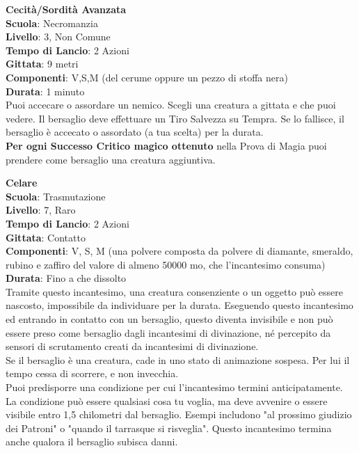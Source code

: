 \begin{multicols}{2}
\medskip\textbf{Cecità/Sordità Avanzata}\\
\textbf{Scuola}: Necromanzia\\
\textbf{Livello}: 3, Non Comune\\
\textbf{Tempo di Lancio}: 2 Azioni\\
\textbf{Gittata}: 9 metri\\
\textbf{Componenti}: V,S,M (del cerume oppure un pezzo di stoffa nera)\\
\textbf{Durata}: 1 minuto\\
Puoi accecare o assordare un nemico. Scegli una creatura a gittata e che puoi vedere. Il bersaglio deve effettuare un Tiro Salvezza su Tempra. Se lo fallisce, il bersaglio è accecato o assordato (a tua scelta) per la durata.\\
\textbf{Per ogni Successo Critico magico ottenuto} nella Prova di Magia puoi prendere come bersaglio una creatura aggiuntiva.

\medskip\textbf{Celare}\\
\textbf{Scuola}: Trasmutazione\\
\textbf{Livello}: 7, Raro\\
\textbf{Tempo di Lancio}: 2 Azioni\\
\textbf{Gittata}: Contatto\\
\textbf{Componenti}: V, S, M (una polvere composta da polvere di diamante, smeraldo, rubino e zaffiro del valore di almeno 50000 mo, che l'incantesimo consuma)\\
\textbf{Durata}: Fino a che dissolto \\
Tramite questo incantesimo, una creatura consenziente o un oggetto può essere nascosto, impossibile da individuare per la durata. Eseguendo questo incantesimo ed entrando in contatto con un bersaglio, questo diventa invisibile e non può essere preso come bersaglio dagli incantesimi di divinazione, né percepito da sensori di scrutamento creati da incantesimi di divinazione.\\
Se il bersaglio è una creatura, cade in uno stato di animazione sospesa. Per lui il tempo cessa di scorrere, e non invecchia. \\
Puoi predisporre una condizione per cui l'incantesimo termini anticipatamente. La condizione può essere qualsiasi cosa tu voglia, ma deve avvenire o essere visibile entro 1,5 chilometri dal bersaglio. Esempi includono "al prossimo giudizio dei Patroni" o "quando il tarrasque si risveglia". Questo incantesimo termina anche qualora il bersaglio subisca danni.


\end{multicols}
